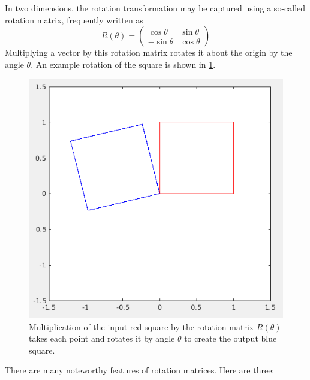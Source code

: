 \documentclass[onefignum,onetabnum]{siamart190516}
\begin{document}
In two dimensions, the rotation transformation may be captured using
a so-called rotation matrix, frequently written as
\begin{equation}
R(\theta) =
\begin{pmatrix}
\cos \theta & \sin \theta \\
-\sin \theta & \cos \theta
\end{pmatrix}
\end{equation}
Multiplying a vector by this rotation matrix 
rotates it about the origin by the angle $\theta$.  An
example rotation of the square is shown in \cref{fig:RotateASquare}.
\begin{figure}[tbh]
	\centering
	\includegraphics[width=0.7\columnwidth]{RotateASquare.png}
	\caption{Multiplication of the input red square by the rotation matrix $R(\theta)$ takes
		each point and rotates it by angle $\theta$ to
		create the output blue square.}
	\label{fig:RotateASquare}
\end{figure}
There are many noteworthy features of rotation matrices.  Here are three:
\end{document}
